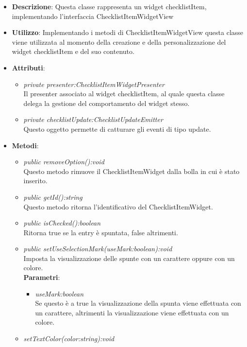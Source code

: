 \begin{itemize}
\item \textbf{Descrizione}: Questa classe rappresenta un widget checklistItem, implementando l'interfaccia ChecklistItemWidgetView
\item \textbf{Utilizzo}: Implementando i metodi di ChecklistItemWidgetView questa classe viene utilizzata al momento della creazione e della personalizzazione del widget checklistItem e del suo contenuto.
\item \textbf{Attributi}:
	\begin{itemize}
	\item \textit{private presenter:ChecklistItemWidgetPresenter}\\
	Il presenter associato al widget checklistItem, al quale questa classe delega la gestione del comportamento del widget stesso.
	\item \textit{private checklistUpdate:ChecklistUpdateEmitter}\\
	Questo oggetto permette di catturare gli eventi di tipo update.
	\end{itemize}
\item \textbf{Metodi}:
	\begin{itemize}
	\item \textit{public removeOption():void}\\
	Questo metodo rimuove il ChecklistItemWidget dalla bolla in cui è stato inserito.
	\item \textit{public getId():string}\\
	Questo metodo ritorna l'identificativo del ChecklistItemWidget.
	\item \textit{public isChecked():boolean}\\
	Ritorna true se la entry è spuntata, false altrimenti.
	\item \textit{public setUseSelectionMark(useMark:boolean):void}\\
	Imposta la visualizzazione delle spunte con un carattere oppure con un colore.
		\\ \textbf{Parametri}: \begin{itemize}
		\item \textit{useMark:boolean}\\
		Se questo è a true la visualizzazione della spunta viene effettuata con un carattere, altrimenti la visualizzazione viene effettuata con un colore.
		\end{itemize}  
		\item \textit{setTextColor(color:string):void}\\

\end{itemize}
\end{itemize}
